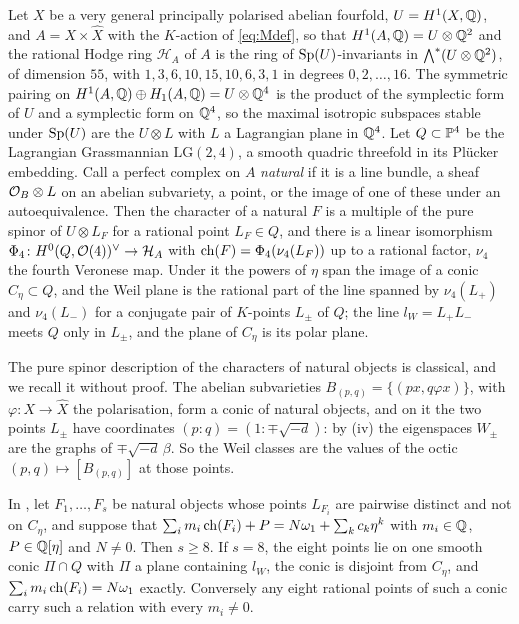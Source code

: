 \begin{setupenv}\label{setup:lagquadric}
Let $X$ be a very general principally polarised abelian fourfold,
$U=H^{1}(X,\mathbb{Q})$, and $A=X\times\widehat{X}$ with the $K$-action of
\eqref{eq:Mdef}, so that $H^{1}(A,\mathbb{Q})=U\otimes\mathbb{Q}^{2}$ and the rational Hodge
ring $\mathcal{H}_{A}$ of $A$ is the ring of $\operatorname{Sp}(U)$-invariants in
$\bigwedge^{*}(U\otimes\mathbb{Q}^{2})$, of dimension $55$, with
$1,3,6,10,15,10,6,3,1$ in degrees $0,2,\dots,16$. The symmetric pairing on
$H^{1}(A,\mathbb{Q})\oplus H_{1}(A,\mathbb{Q})=U\otimes\mathbb{Q}^{4}$ is the product of the
symplectic form of $U$ and a symplectic form on $\mathbb{Q}^{4}$, so the maximal
isotropic subspaces stable under $\operatorname{Sp}(U)$ are the $U\otimes L$ with $L$ a
Lagrangian plane in $\mathbb{Q}^{4}$. Let $Q\subset\mathbb{P}^{4}$ be the Lagrangian
Grassmannian $\mathrm{LG}(2,4)$, a smooth quadric threefold in its
Pl\"ucker embedding. Call a perfect complex on $A$ \emph{natural} if it is a line
bundle, a sheaf $\mathcal{O}_{B}\otimes L$ on an abelian subvariety, a point, or the
image of one of these under an autoequivalence. Then the character of a natural
$F$ is a multiple of the pure spinor of $U\otimes L_{F}$ for a rational point
$L_{F}\in Q$, and there is a linear isomorphism
$\Phi_{4}\colon H^{0}(Q,\mathcal{O}(4))^{\vee}\to\mathcal{H}_{A}$ with
$\operatorname{ch}(F)=\Phi_{4}(\nu_{4}(L_{F}))$ up to a rational factor, $\nu_{4}$ the
fourth Veronese map. Under it the powers of $\eta$ span the image of a conic
$C_{\eta}\subset Q$, and the Weil plane is the rational part of the line
spanned by $\nu_{4}(L_{+})$ and $\nu_{4}(L_{-})$ for a conjugate pair of
$K$-points $L_{\pm}$ of $Q$; the line $l_{W}=L_{+}L_{-}$ meets $Q$ only in
$L_{\pm}$, and the plane of $C_{\eta}$ is its polar plane.
\end{setupenv}

The pure spinor description of the characters of natural objects is
classical, and we recall it without proof. The abelian subvarieties
$B_{(p,q)}=\{(px,q\varphi x)\}$, with $\varphi\colon X\to\widehat{X}$ the
polarisation, form a conic of natural objects, and on it the two points $L_{\pm}$
have coordinates $(p:q)=(1:\mp\sqrt{-d})$: by (iv) the
eigenspaces $W_{\pm}$ are the graphs of $\mp\sqrt{-d}\,\beta$. So the Weil
classes are the values of the octic $(p,q)\mapsto[B_{(p,q)}]$ at those points.

\begin{theorem}[Minimal support at $n=4$]\label{thm:minimalsupport}
In , let $F_{1},\dots,F_{s}$ be natural objects whose
points $L_{F_{i}}$ are pairwise distinct and not on $C_{\eta}$, and suppose
that $\sum_{i}m_{i}\operatorname{ch}(F_{i})+P=N\omega_{1}+\sum_{k}c_{k}\eta^{k}$ with
$m_{i}\in\mathbb{Q}$, $P\in\mathbb{Q}[\eta]$ and $N\ne0$. Then $s\ge8$. If $s=8$, the eight
points lie on one smooth conic $\Pi\cap Q$ with $\Pi$ a plane containing
$l_{W}$, the conic is disjoint from $C_{\eta}$, and
$\sum_{i}m_{i}\operatorname{ch}(F_{i})=N\omega_{1}$ exactly. Conversely any eight rational
points of such a conic carry such a relation with every $m_{i}\ne0$.
\end{theorem}

